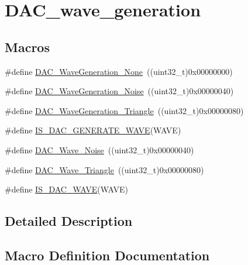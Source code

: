 \hypertarget{group___d_a_c__wave__generation}{}\section{D\+A\+C\+\_\+wave\+\_\+generation}
\label{group___d_a_c__wave__generation}
\subsection*{Macros}
\begin{DoxyCompactItemize}
\item 
\#define \mbox{\hyperlink{group___d_a_c__wave__generation_gaabbcd575d6106267f6b65ce988158f29}{D\+A\+C\+\_\+\+Wave\+Generation\+\_\+\+None}}~((uint32\+\_\+t)0x00000000)
\item 
\#define \mbox{\hyperlink{group___d_a_c__wave__generation_ga1692990325098cae6f32182c1fa0f61e}{D\+A\+C\+\_\+\+Wave\+Generation\+\_\+\+Noise}}~((uint32\+\_\+t)0x00000040)
\item 
\#define \mbox{\hyperlink{group___d_a_c__wave__generation_ga68f1a71011437a5ea6298ab039554714}{D\+A\+C\+\_\+\+Wave\+Generation\+\_\+\+Triangle}}~((uint32\+\_\+t)0x00000080)
\item 
\#define \mbox{\hyperlink{group___d_a_c__wave__generation_ga50fb2dd12305cd7bd0b738a1f6388d3c}{I\+S\+\_\+\+D\+A\+C\+\_\+\+G\+E\+N\+E\+R\+A\+T\+E\+\_\+\+W\+A\+VE}}(W\+A\+VE)
\item 
\#define \mbox{\hyperlink{group___d_a_c__wave__generation_ga09c5ee68f8e726b1c039df1f6e195965}{D\+A\+C\+\_\+\+Wave\+\_\+\+Noise}}~((uint32\+\_\+t)0x00000040)
\item 
\#define \mbox{\hyperlink{group___d_a_c__wave__generation_ga95a1566e1728e1e345e8f3b50629a075}{D\+A\+C\+\_\+\+Wave\+\_\+\+Triangle}}~((uint32\+\_\+t)0x00000080)
\item 
\#define \mbox{\hyperlink{group___d_a_c__wave__generation_ga45c25065fb713820f6dbae0009376e1c}{I\+S\+\_\+\+D\+A\+C\+\_\+\+W\+A\+VE}}(W\+A\+VE)
\end{DoxyCompactItemize}


\subsection{Detailed Description}


\subsection{Macro Definition Documentation}
\mbox{\label{group___d_a_c__wave__generation_ga09c5ee68f8e726b1c039df1f6e195965}} 

